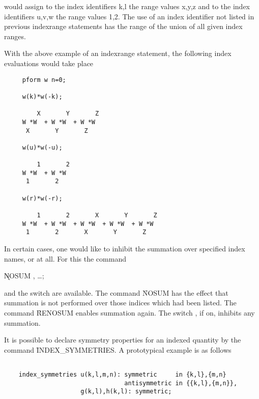 would assign to the index identifiers k,l the range values x,y,z and
to the index identifiers u,v,w the range values 1,2. The use of an
index identifier not listed in previous indexrange statements has the
range of the union of all given index ranges.

With the above example of an indexrange statement, the following
index evaluations would take place

\begin{verbatim}
     pform w n=0;

     w(k)*w(-k);

         X       Y       Z
     W *W  + W *W  + W *W
      X       Y       Z

     w(u)*w(-u);

         1       2
     W *W  + W *W
      1       2

     w(r)*w(-r);

         1       2       X       Y       Z
     W *W  + W *W  + W *W  + W *W  + W *W
      1       2       X       Y       Z
\end{verbatim}

In certain cases, one would like to inhibit the summation over
specified index names, or at all.  For this the command

\hypertarget{command:NOSUM}{}
\hspace*{2em} \k{NOSUM} , \ldots;\label{NOSUM}

and the switch  are
\hypertarget{command:RENOSUM}{}
\hypertarget{switch:NOSUM}{}
available.  The command \f{NOSUM} has the effect that summation is
not performed over those indices which had been listed.  The command
\f{RENOSUM}\label{RENOSUM} enables summation again.  The switch ,
if on, inhibits any summation. 

\label{INDEXSYMMETRIES} 
\hypertarget{command:INDEX_SYMMETRIES}{}
It is possible to declare symmetry properties for an indexed quantity by
the command \f{INDEX\_SYMMETRIES}. A prototypical example is as
follows

\begin{verbatim}

    index_symmetries u(k,l,m,n): symmetric     in {k,l},{m,n}
                                 antisymmetric in {{k,l},{m,n}},
                     g(k,l),h(k,l): symmetric;

\end{verbatim}

